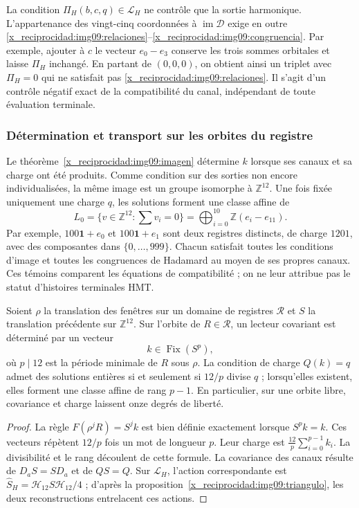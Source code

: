 La condition $\Pi_H(b,c,q)\in\mathcal L_H$ ne contrôle que la
sortie harmonique. L'appartenance des vingt-cinq coordonnées à
$\operatorname{im}\mathcal D$ exige en outre
\eqref{x_reciprocidad:img09:relaciones}--\eqref{x_reciprocidad:img09:congruencia}.
Par exemple, ajouter à $c$ le vecteur $e_0-e_3$ conserve les trois sommes
orbitales et laisse $\Pi_H$ inchangé. En partant de $(0,0,0)$, on
obtient ainsi un triplet avec $\Pi_H=0$ qui ne satisfait pas
\eqref{x_reciprocidad:img09:relaciones}. Il s'agit d'un contrôle négatif exact de la
compatibilité du canal, indépendant de toute évaluation terminale.

\subsubsection{Détermination et transport sur les orbites du registre}

Le théorème~\ref{x_reciprocidad:img09:imagen} détermine $k$ lorsque ses
canaux et sa charge ont été produits. Comme condition sur des sorties non encore
individualisées, la même image est un groupe isomorphe à
$\mathbb Z^{12}$. Une fois fixée uniquement une charge $q$, les solutions
forment une classe affine de
\[
 L_0=\{v\in\mathbb Z^{12}:\sum v_i=0\}
 =\bigoplus_{i=0}^{10}\mathbb Z(e_i-e_{11}).
\]
Par exemple, $100\mathbf1+e_0$ et $100\mathbf1+e_1$ sont deux
registres distincts, de charge $1201$, avec des composantes dans
$\{0,\ldots,999\}$. Chacun satisfait toutes les conditions
d'image et toutes les congruences de Hadamard au moyen de ses propres
canaux. Ces témoins comparent les équations de compatibilité ;
on ne leur attribue pas le statut d'histoires terminales HMT.

\begin{proposition}
\label{x_reciprocidad:img09:covariancia}
Soient $\rho$ la translation des fenêtres sur un domaine de registres
$\mathscr R$ et $S$ la translation précédente sur $\mathbb Z^{12}$.
Sur l'orbite de $R\in\mathscr R$, un lecteur covariant est
déterminé par un vecteur
\[
 k\in\operatorname{Fix}(S^p),
\]
où $p\mid12$ est la période minimale de $R$ sous $\rho$.
La condition de charge $Q(k)=q$ admet des solutions entières si et seulement si
$12/p$ divise $q$ ; lorsqu'elles existent, elles forment une classe affine de rang
$p-1$. En particulier, sur une orbite libre, covariance et charge
laissent onze degrés de liberté.
\end{proposition}
\begin{proof}
La règle $F(\rho^jR)=S^jk$ est bien définie exactement lorsque
$S^pk=k$. Ces vecteurs répètent $12/p$ fois un mot de
longueur $p$. Leur charge est $\frac{12}{p}\sum_{i=0}^{p-1}k_i$.
La divisibilité et le rang découlent de cette formule. La
covariance des canaux résulte de $D_aS=SD_a$ et de $QS=Q$.
Sur $\mathcal L_H$, l'action correspondante est
$\widehat S_H=\mathcal H_{12}S\mathcal H_{12}/4$ ;
d'après la proposition~\ref{x_reciprocidad:img09:triangulo}, les deux reconstructions
entrelacent ces actions.
\end{proof}

